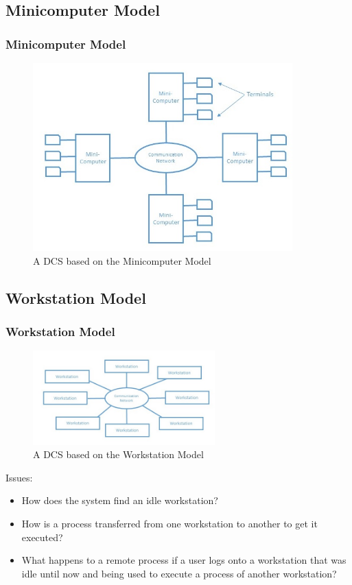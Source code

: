 \documentclass{beamer}
\begin{document}
\subsection{Minicomputer Model}
\begin{frame}
    \frametitle{Minicomputer Model}
    \begin{figure}
        \centering
        \includegraphics[width=10cm]{miniComputerModel}
        \caption{A DCS based on the Minicomputer Model}\label{minicomputermodel}
        \end{figure}
        \vspace{3cm}
\end{frame}



\subsection{Workstation Model}
\begin{frame}
    \frametitle{Workstation Model}
\begin{figure}
  \centering
  \includegraphics[width=7cm]{workStationModel}
  \caption{A DCS based on the Workstation Model}\label{workstationmodel}
\end{figure}

    Issues:
    \begin{itemize}
      \item {How does the system find an idle workstation?}
      \item {How is a process transferred from one workstation to another to get it executed?}
      \item {What happens to a remote process if a user logs onto a workstation that was idle until now and being used to execute a process of another workstation?}
    \end{itemize}
\end{frame}
\end{document}
